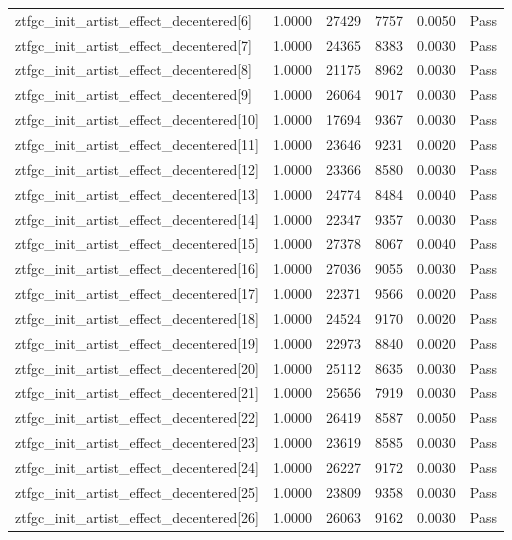 \begin{table}[htbp]
\begin{tabular}{llrrll}
ztfgc\_init\_artist\_effect\_decentered[6] & 1.0000 & 27429 & 7757 & 0.0050 & Pass \\
ztfgc\_init\_artist\_effect\_decentered[7] & 1.0000 & 24365 & 8383 & 0.0030 & Pass \\
ztfgc\_init\_artist\_effect\_decentered[8] & 1.0000 & 21175 & 8962 & 0.0030 & Pass \\
ztfgc\_init\_artist\_effect\_decentered[9] & 1.0000 & 26064 & 9017 & 0.0030 & Pass \\
ztfgc\_init\_artist\_effect\_decentered[10] & 1.0000 & 17694 & 9367 & 0.0030 & Pass \\
ztfgc\_init\_artist\_effect\_decentered[11] & 1.0000 & 23646 & 9231 & 0.0020 & Pass \\
ztfgc\_init\_artist\_effect\_decentered[12] & 1.0000 & 23366 & 8580 & 0.0030 & Pass \\
ztfgc\_init\_artist\_effect\_decentered[13] & 1.0000 & 24774 & 8484 & 0.0040 & Pass \\
ztfgc\_init\_artist\_effect\_decentered[14] & 1.0000 & 22347 & 9357 & 0.0030 & Pass \\
ztfgc\_init\_artist\_effect\_decentered[15] & 1.0000 & 27378 & 8067 & 0.0040 & Pass \\
ztfgc\_init\_artist\_effect\_decentered[16] & 1.0000 & 27036 & 9055 & 0.0030 & Pass \\
ztfgc\_init\_artist\_effect\_decentered[17] & 1.0000 & 22371 & 9566 & 0.0020 & Pass \\
ztfgc\_init\_artist\_effect\_decentered[18] & 1.0000 & 24524 & 9170 & 0.0020 & Pass \\
ztfgc\_init\_artist\_effect\_decentered[19] & 1.0000 & 22973 & 8840 & 0.0020 & Pass \\
ztfgc\_init\_artist\_effect\_decentered[20] & 1.0000 & 25112 & 8635 & 0.0030 & Pass \\
ztfgc\_init\_artist\_effect\_decentered[21] & 1.0000 & 25656 & 7919 & 0.0030 & Pass \\
ztfgc\_init\_artist\_effect\_decentered[22] & 1.0000 & 26419 & 8587 & 0.0050 & Pass \\
ztfgc\_init\_artist\_effect\_decentered[23] & 1.0000 & 23619 & 8585 & 0.0030 & Pass \\
ztfgc\_init\_artist\_effect\_decentered[24] & 1.0000 & 26227 & 9172 & 0.0030 & Pass \\
ztfgc\_init\_artist\_effect\_decentered[25] & 1.0000 & 23809 & 9358 & 0.0030 & Pass \\
ztfgc\_init\_artist\_effect\_decentered[26] & 1.0000 & 26063 & 9162 & 0.0030 & Pass \\

\end{tabular}
\end{table}
